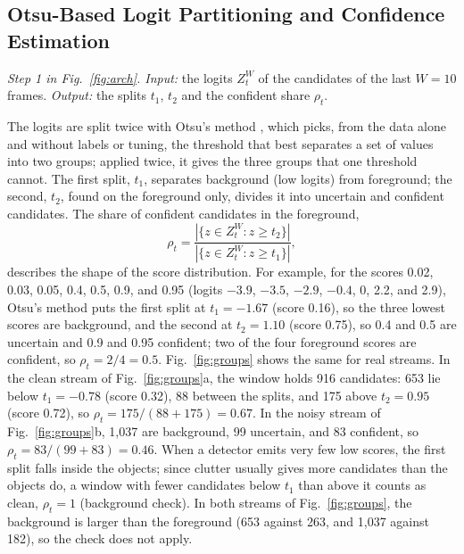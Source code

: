 \documentclass[pdflatex,sn-mathphys-num,iicol]{sn-jnl}
\begin{document}
\subsection{Otsu-Based Logit Partitioning and Confidence Estimation}\label{sec:calib}
\emph{Step 1 in Fig.~\ref{fig:arch}. Input:} the logits $Z_t^W$ of the candidates of the last $W=10$ frames. \emph{Output:} the
splits $t_1$, $t_2$ and the confident share $\rho_t$.

The logits are split twice with Otsu's method \cite{otsu1979}, which picks, from the data alone
and without labels or tuning, the threshold that best separates a set of values into two groups;
applied twice, it gives the three groups that one threshold cannot. The first split, $t_1$,
separates background (low logits) from foreground; the second, $t_2$, found on the foreground only,
divides it into uncertain and confident candidates. The share of confident candidates in the
foreground,
\begin{equation}
\rho_t=\frac{\left|\{z\in Z_t^W: z\ge t_2\}\right|}{\left|\{z\in Z_t^W: z\ge t_1\}\right|},
\label{eq:rho}
\end{equation}
describes the shape of the score distribution. For example, for the scores
0.02, 0.03, 0.05, 0.4, 0.5, 0.9, and 0.95 (logits $-3.9$, $-3.5$, $-2.9$, $-0.4$, 0, 2.2, and 2.9),
Otsu's method puts the first split at $t_1=-1.67$ (score 0.16), so the three lowest scores are
background, and the second at $t_2=1.10$ (score 0.75), so 0.4 and 0.5 are uncertain and 0.9 and
0.95 confident; two of the four foreground scores are confident, so $\rho_t=2/4=0.5$.
Fig.~\ref{fig:groups} shows the same for real streams. In the clean stream of
Fig.~\ref{fig:groups}a, the window holds 916 candidates: 653 lie below $t_1=-0.78$ (score 0.32),
88 between the splits, and 175 above $t_2=0.95$ (score 0.72), so $\rho_t=175/(88+175)=0.67$. In
the noisy stream of Fig.~\ref{fig:groups}b, 1,037 are background, 99 uncertain, and 83 confident,
so $\rho_t=83/(99+83)=0.46$. When a detector emits very few low scores, the first split falls inside
the objects; since clutter usually gives more candidates than the objects do, a window with fewer
candidates below $t_1$ than above it counts as clean, $\rho_t=1$ (background check). In both
streams of Fig.~\ref{fig:groups}, the background is larger than the foreground (653 against 263,
and 1,037 against 182), so the check does not apply.
\end{document}
